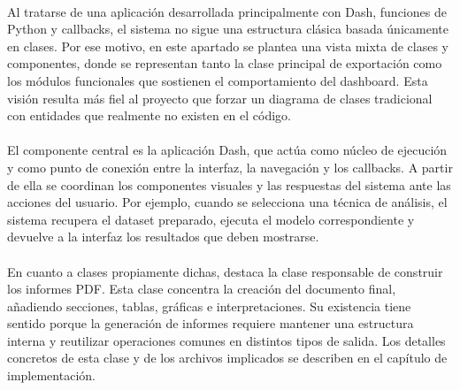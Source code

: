 \paragraph*{}
Al tratarse de una aplicación desarrollada principalmente con Dash, funciones de Python y callbacks, el sistema no sigue una estructura clásica basada únicamente en clases. Por ese motivo, en este apartado se plantea una vista mixta de clases y componentes, donde se representan tanto la clase principal de exportación como los módulos funcionales que sostienen el comportamiento del dashboard. Esta visión resulta más fiel al proyecto que forzar un diagrama de clases tradicional con entidades que realmente no existen en el código.

\paragraph*{}
El componente central es la aplicación Dash, que actúa como núcleo de ejecución y como punto de conexión entre la interfaz, la navegación y los callbacks. A partir de ella se coordinan los componentes visuales y las respuestas del sistema ante las acciones del usuario. Por ejemplo, cuando se selecciona una técnica de análisis, el sistema recupera el dataset preparado, ejecuta el modelo correspondiente y devuelve a la interfaz los resultados que deben mostrarse.

\paragraph*{}
En cuanto a clases propiamente dichas, destaca la clase responsable de construir los informes PDF. Esta clase concentra la creación del documento final, añadiendo secciones, tablas, gráficas e interpretaciones. Su existencia tiene sentido porque la generación de informes requiere mantener una estructura interna y reutilizar operaciones comunes en distintos tipos de salida. Los detalles concretos de esta clase y de los archivos implicados se describen en el capítulo de implementación.


